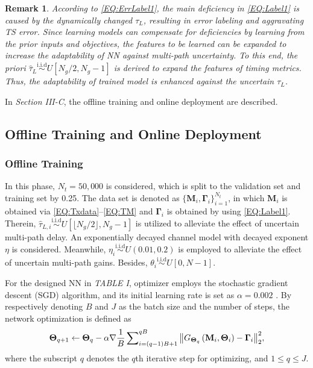 \documentclass[conference]{IEEEtran}
\newtheorem{remark}{Remark}
\begin{document}
\vspace{-1mm}
\begin{remark}
According to \eqref{EQ:ErrLabel1}, the main deficiency in \eqref{EQ:Label1} is caused by the dynamically changed ${\tau}_L$, resulting in error labeling and aggravating TS error.
Since learning models can compensate for deficiencies by learning from the prior inputs and objectives, the features to be learned can be expanded to increase the adaptability of NN against multi-path uncertainty.
To this end, the priori ${\hat \tau}_{L}\mathop \sim \limits^{\textrm{i.i.d}}U[N_g/2, N_g-1]$ is derived to expand the features of timing metrics.
Thus, the adaptability of trained model is enhanced against the uncertain ${\tau}_L$.
\end{remark}

In \emph{Section III-C}, the offline training and online deployment are described.
\vspace{-4mm}
\subsection{Offline Training and Online Deployment}
\subsubsection{Offline Training}
In this phase, $N_t=50,000$ is considered, which is split to the validation set and training set by 0.25.
The data set is denoted as $\{\mathbf{M}_i,{\bm\Gamma}_i\}^{N_t}_{i=1}$, in which $\mathbf{M}_i$ is obtained via \eqref{EQ:Txdata}--\eqref{EQ:TM} and ${\bm\Gamma}_i$ is obtained by using \eqref{EQ:Label1}.
Therein, ${\hat \tau}_{L,i}\mathop \sim \limits^{\textrm{i.i.d}} {U}[\lfloor N_g/2\rfloor, N_g-1]$ is utilized to alleviate the effect of uncertain multi-path delay. An exponentially decayed channel model \cite{ref:Ch1} with decayed exponent $\eta$ is considered. Meanwhile, $\eta_i\mathop \sim \limits^{\textrm{i.i.d}}U(0.01, 0.2)$ is employed to alleviate the effect of uncertain multi-path gains.
Besides, $\theta_i\mathop \sim \limits^{\textrm{i.i.d}}{U}\left[0,N-1\right]$.

For the designed NN in \emph{TABLE I}, optimizer employs the stochastic gradient descent (SGD) algorithm, and its initial learning rate is set as $\alpha=0.002$ \cite{ref:adam}.
By respectively denoting $B$ and $J$ as the batch size and the number of steps, the network optimization is defined as\cite{ref:adam}
\begin{equation}\label{EQ:SGD}
  {{{\bf \Theta} _{q + 1}} \leftarrow {{\bf \Theta}_q} - \alpha \nabla \frac{1}{B}\sum\nolimits_{i = (q-1)B+1}^{qB} {\left\| {{G_{{\bf \Theta}_q} }\left( {{{\bf{M }}_i}},{{\bf \Theta}_i} \right) - {{\bf{\Gamma}}_i}} \right\|_2^2}} ,
\end{equation}
where the subscript $q$ denotes the $q$th iterative step for optimizing, and $1\le q\le J$.
\end{document}
